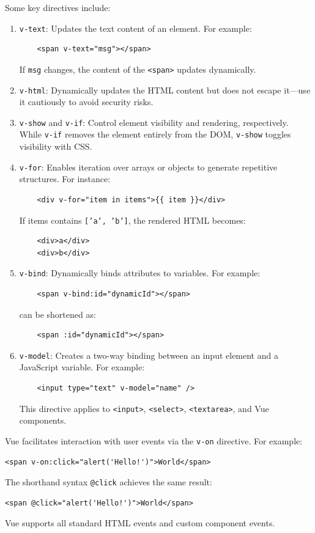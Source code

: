 Some key directives include:
\begin{enumerate}
    \item \texttt{v-text}: Updates the text content of an element. For example:
    \begin{verbatim}
    <span v-text="msg"></span>
    \end{verbatim}
    If \texttt{msg} changes, the content of the \texttt{<span>} updates dynamically.

    \item \texttt{v-html}: Dynamically updates the HTML content but does not escape it—use it cautiously to avoid security risks.

    \item \texttt{v-show} and \texttt{v-if}: Control element visibility and rendering, respectively. While \texttt{v-if} removes the element entirely from the DOM, \texttt{v-show} toggles visibility with CSS.

    \item \texttt{v-for}: Enables iteration over arrays or objects to generate repetitive structures. For instance:
    \begin{verbatim}
    <div v-for="item in items">{{ item }}</div>
    \end{verbatim}
    If items contains \texttt{['a', 'b']}, the rendered HTML becomes:
    \begin{verbatim}
    <div>a</div>
    <div>b</div>
    \end{verbatim}
    \item \texttt{v-bind}: Dynamically binds attributes to variables. For example:
    \begin{verbatim}
    <span v-bind:id="dynamicId"></span>
    \end{verbatim}
    can be shortened as:
    \begin{verbatim}
    <span :id="dynamicId"></span>
    \end{verbatim}
    \item \texttt{v-model}: Creates a two-way binding between an input element and a JavaScript variable. For example:
    \begin{verbatim}
    <input type="text" v-model="name" />
    \end{verbatim}
    This directive applies to \texttt{<input>}, \texttt{<select>}, \texttt{<textarea>}, and Vue components.
\end{enumerate}

Vue facilitates interaction with user events via the \texttt{v-on} directive. For example:
\begin{verbatim}
<span v-on:click="alert('Hello!')">World</span>
\end{verbatim}
The shorthand syntax \texttt{@click} achieves the same result:
\begin{verbatim}
<span @click="alert('Hello!')">World</span>
\end{verbatim}
Vue supports all standard HTML events and custom component events.

